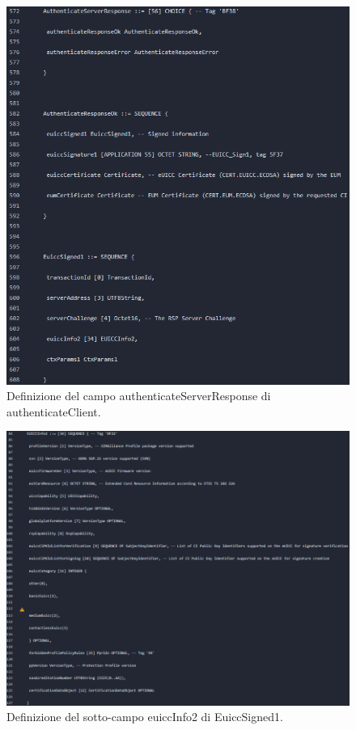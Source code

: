\documentclass[10pt, oneside]{book}
\begin{document}
\begin{figure}
\includegraphics[width=\linewidth]{def-authenticateServerResponse1.png}
\caption{Definizione del campo authenticateServerResponse di authenticateClient.}
\label{fig:def-authenticateServerResponse1}
\end{figure}
\begin{figure}
\includegraphics[width=\linewidth]{def-authenticateServerResponse2.png}
\caption{Definizione del sotto-campo euiccInfo2 di EuiccSigned1.}
\label{fig:def-authenticateServerResponse2}
\end{figure}
\end{document}
